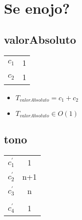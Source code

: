 \documentclass{article}
\begin{document}
    \section*{Se enojo?}

    \subsection*{valorAbsoluto}

    \begin{minipage}{0.70\textwidth}
        
    \end{minipage}
    \hfill
    \begin{minipage}{0.25\textwidth}
        \begin{tabular}{|c|c}

            $c_1$ & 1 \\
            $c_2$ & 1 \\
           
        \end{tabular}
    \end{minipage}

    \begin{itemize}
        \item $T_{valorAbsoluto} = c_1 + c_2$
        \item $T_{valorAbsoluto} \in O(1)$
    \end{itemize}

    \subsection*{tono}

    \begin{minipage}{0.70\textwidth}
        
    \end{minipage}
    \hfill
    \begin{minipage}{0.25\textwidth}
        \begin{tabular}{|c|c}

            $c^{\prime}_1$ & 1 \\
            $c^{\prime}_2$ & n+1 \\
            $c^{\prime}_3$ & n \\
            $   $ &   \\
            $c^{\prime}_4$ & 1 \\

        \end{tabular}
    \end{minipage}
\end{document}
